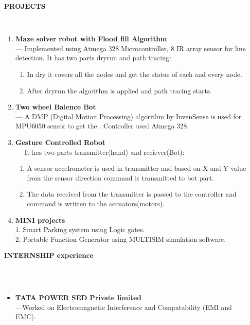 \documentclass[a4paper,10pt]{article}
\newcommand{\lsep}{-0.5cm}
\newcommand{\resheading}[1]{{\small \colorbox{mygrey}{\begin{minipage}{0.975\textwidth}{\textbf{#1 \vphantom{p\^{E}}}}\end{minipage}}}}
\begin{document}
\resheading{\textbf{PROJECTS} }\\[\lsep]
\begin{enumerate}
\item \noindent \textbf{Maze solver robot with Flood fill Algorithm}\\
\indent --- Implemented using Atmega 328 Microcontroller, 8 IR array sensor for line detection. It has two parts dryrun and path tracing:
\begin{enumerate}
\item In dry it covers all the nodes and get the status of each and every node.
\item  After dryrun the algorithm is applied and path tracing starts.
\end{enumerate} 

\item\noindent\textbf{Two wheel Balence Bot}\\
\indent --- A DMP (Digital Motion Processing) algorithm by InvenSense is used for MPU6050 sensor to get the . Controller used Atmega 328.

\item\noindent\textbf{Gesture Controlled Robot}\\
\indent --- It has two parts transmitter(hand) and reciever(Bot):
\begin{enumerate}
\item  A sensor accelrometer is used in transmitter and based on X and Y value from the sensor direction command is transmitted to bot part.
\item The data received from the transmitter is passed to the controller and command is written to the accuators(motors).
\end{enumerate}
\item\noindent\textbf{MINI projects}\\
1. Smart Parking system using Logic gates.\\
2. Portable Function Generator using MULTISIM simulation software.
\end{enumerate}

\resheading{\textbf{INTERNSHIP experience} }\\\\[\lsep]
\begin{itemize}
\item\noindent\textbf{TATA POWER SED Private limited}\\
\indent ---Worked on Electromagnetic Interference and Compatability (EMI and EMC).
\end{itemize}
\end{document}
